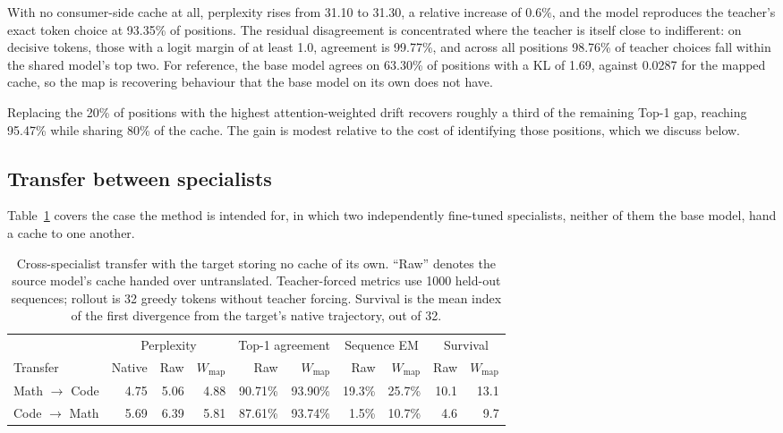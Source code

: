 \documentclass[11pt]{article}
\begin{document}
With no consumer-side cache at all, perplexity rises from 31.10 to 31.30, a relative
increase of $0.6\%$, and the model reproduces the teacher's exact token choice at 93.35\% of
positions. The residual disagreement is concentrated where the teacher is itself close to
indifferent: on decisive tokens, those with a logit margin of at least 1.0, agreement is
99.77\%, and across all positions 98.76\% of teacher choices fall within the shared model's
top two. For reference, the base model agrees on 63.30\% of positions with a KL of 1.69,
against 0.0287 for the mapped cache, so the map is recovering behaviour that the base model
on its own does not have.

Replacing the 20\% of positions with the highest attention-weighted drift recovers roughly a
third of the remaining Top-1 gap, reaching 95.47\% while sharing 80\% of the cache. The gain
is modest relative to the cost of identifying those positions, which we discuss below.

\subsection{Transfer between specialists}

Table~\ref{tab:cross} covers the case the method is intended for, in which two independently
fine-tuned specialists, neither of them the base model, hand a cache to one another.

\begin{table}[ht]
\centering
\footnotesize
\setlength{\tabcolsep}{4pt}
\caption{Cross-specialist transfer with the target storing no cache of its own. ``Raw''
denotes the source model's cache handed over untranslated. Teacher-forced metrics use 1000
held-out sequences; rollout is 32 greedy tokens without teacher forcing. Survival is the
mean index of the first divergence from the target's native trajectory, out of 32.}
\label{tab:cross}
\begin{tabular}{lrrrrrrrrr}
\toprule
& \multicolumn{3}{c}{Perplexity} & \multicolumn{2}{c}{Top-1 agreement} & \multicolumn{2}{c}{Sequence EM} & \multicolumn{2}{c}{Survival} \\
\cmidrule(lr){2-4}\cmidrule(lr){5-6}\cmidrule(lr){7-8}\cmidrule(lr){9-10}
Transfer & Native & Raw & $W_{\mathrm{map}}$ & Raw & $W_{\mathrm{map}}$ & Raw & $W_{\mathrm{map}}$ & Raw & $W_{\mathrm{map}}$ \\
\midrule
Math $\rightarrow$ Code & 4.75 & 5.06 & 4.88 & 90.71\% & 93.90\% & 19.3\% & 25.7\% & 10.1 & 13.1 \\
Code $\rightarrow$ Math & 5.69 & 6.39 & 5.81 & 87.61\% & 93.74\% & \phantom{0}1.5\% & 10.7\% & \phantom{0}4.6 & \phantom{0}9.7 \\
\bottomrule
\end{tabular}
\end{table}
\end{document}
